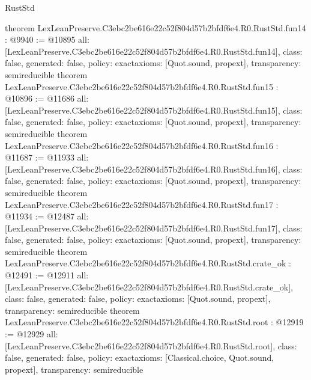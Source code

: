 \begin{lexlean}{RustStd}
\begin{coremodule}
{}
theorem LexLeanPreserve.C3ebc2be616e22c52f804d57b2bfdf6e4.R0.RustStd.fun14 : @9940 := @10895 {
  all: [LexLeanPreserve.C3ebc2be616e22c52f804d57b2bfdf6e4.R0.RustStd.fun14],
  class: false,
  generated: false,
  policy: exact{axioms: [Quot.sound, propext]},
  transparency: semireducible
}
theorem LexLeanPreserve.C3ebc2be616e22c52f804d57b2bfdf6e4.R0.RustStd.fun15 : @10896 := @11686 {
  all: [LexLeanPreserve.C3ebc2be616e22c52f804d57b2bfdf6e4.R0.RustStd.fun15],
  class: false,
  generated: false,
  policy: exact{axioms: [Quot.sound, propext]},
  transparency: semireducible
}
theorem LexLeanPreserve.C3ebc2be616e22c52f804d57b2bfdf6e4.R0.RustStd.fun16 : @11687 := @11933 {
  all: [LexLeanPreserve.C3ebc2be616e22c52f804d57b2bfdf6e4.R0.RustStd.fun16],
  class: false,
  generated: false,
  policy: exact{axioms: [Quot.sound, propext]},
  transparency: semireducible
}
theorem LexLeanPreserve.C3ebc2be616e22c52f804d57b2bfdf6e4.R0.RustStd.fun17 : @11934 := @12487 {
  all: [LexLeanPreserve.C3ebc2be616e22c52f804d57b2bfdf6e4.R0.RustStd.fun17],
  class: false,
  generated: false,
  policy: exact{axioms: [Quot.sound, propext]},
  transparency: semireducible
}
theorem LexLeanPreserve.C3ebc2be616e22c52f804d57b2bfdf6e4.R0.RustStd.crate_ok : @12491 := @12911 {
  all: [LexLeanPreserve.C3ebc2be616e22c52f804d57b2bfdf6e4.R0.RustStd.crate_ok],
  class: false,
  generated: false,
  policy: exact{axioms: [Quot.sound, propext]},
  transparency: semireducible
}
theorem LexLeanPreserve.C3ebc2be616e22c52f804d57b2bfdf6e4.R0.RustStd.root : @12919 := @12929 {
  all: [LexLeanPreserve.C3ebc2be616e22c52f804d57b2bfdf6e4.R0.RustStd.root],
  class: false,
  generated: false,
  policy: exact{axioms: [Classical.choice, Quot.sound, propext]},
  transparency: semireducible
}


\end{coremodule}
\end{lexlean}
